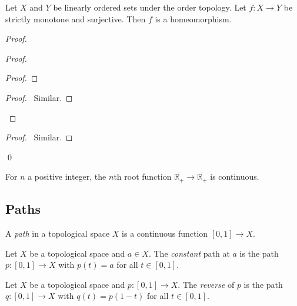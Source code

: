 \begin{prop}
Let $X$ and $Y$ be linearly ordered sets under the order topology. Let $f : X \rightarrow Y$ be strictly monotone and surjective. Then $f$ is a homeomorphism.
\end{prop}

\begin{proof}
\pf
{}
\begin{proof}
	\begin{proof}
	\end{proof}
	\begin{proof}
		\pf\ Similar.
	\end{proof}
\end{proof}
\begin{proof}
	\pf\ Similar.
\end{proof}
\qed
\end{proof}

\begin{cor}
For $n$ a positive integer, the $n$th root function $\overline{\mathbb{R}_+} \rightarrow \overline{\mathbb{R}_+}$ is continuous.
\end{cor}

\subsection{Paths}

\begin{df}[Path]
A \emph{path} in a topological space $X$ is a continuous function $[0,1] \rightarrow X$.
\end{df}

\begin{df}
Let $X$ be a topological space and $a \in X$. The \emph{constant} path at $a$ is the path $p : [0,1] \rightarrow X$ with $p(t) = a$ for all $t \in [0,1]$.
\end{df}

\begin{df}
Let $X$ be a topological space and $p : [0,1] \rightarrow X$. The \emph{reverse} of $p$ is the path $q : [0,1] \rightarrow X$ with $q(t) = p(1-t)$ for all $t \in [0,1]$.
\end{df}

